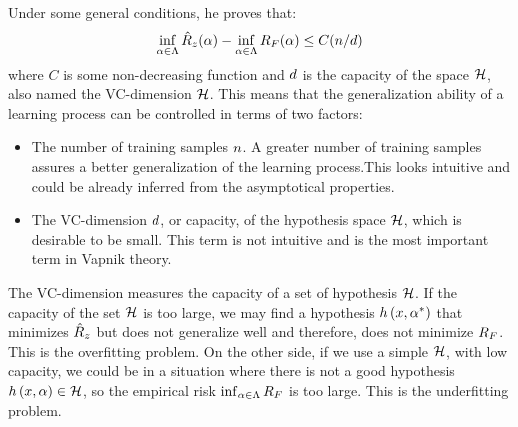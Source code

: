 Under some general conditions, he proves that:
\begin{equation}\label{eq:ordinary_generalization_bound}
    \inf_{\param \in \paramspace} \emprisk(\param) - \inf_{\param \in \paramspace} \exprisk(\param) \leq C(\nsamples/\vcdim)
\end{equation}
where $C$ is some non-decreasing function and $d$ is the capacity of the space $\mathcal{H}$, also named the VC-dimension $\mathcal{H}$. This means that the generalization ability of a learning process can be controlled in terms of two factors:
\begin{itemize}
    \item The number of training samples $n$. A greater number of training samples assures a better generalization of the learning process.This looks intuitive and could be already inferred from the asymptotical properties. 
    \item The VC-dimension $d$, or capacity, of the hypothesis space $\mathcal{H}$, which is desirable to be small. This term is not intuitive and is the most important term in Vapnik theory.
\end{itemize}
The VC-dimension measures the capacity of a set of hypothesis $\mathcal{H}$. 
If the capacity of the set $\mathcal{H}$ is too large, we may find a
hypothesis $h\left(x, {\alpha}^*\right)$ that minimizes $\hat{R}_z$ but does not 
generalize well and therefore, does not minimize $R_F$. This is the 
overfitting problem. 
On the other side, if we use a simple $\mathcal{H}$, 
with low capacity, we could be in a situation where there is not a good hypothesis $h\left(x, \alpha\right) \in \mathcal{H}$, so the empirical risk $\inf_{\alpha \in \Lambda} R_F$ is too large. This is the underfitting problem.


